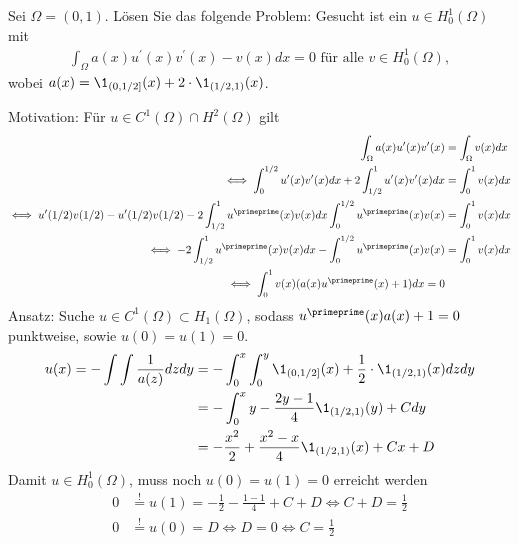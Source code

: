 
\begin{exercise}

Sei $\Omega = (0,1)$. Lösen Sie das folgende Problem: Gesucht ist ein $u \in H_0^1(\Omega)$ mit
\begin{align*}
  \int_\Omega a(x)u^{\prime}(x)v^{\prime}(x) - v(x) dx = 0 \text{ für alle } v \in H_0^1(\Omega),
\end{align*}
wobei $a(x) = \1_{(0,1/2]}(x) + 2\cdot\1_{(1/2,1)}(x)$.
\end{exercise}


\begin{solution}
Motivation: Für $u \in C^1(\Omega) \cap H^2(\Omega)$ gilt
\begin{align*}
  \int_\Omega a(x)u^{\prime}(x)v^{\prime}(x) &= \int_\Omega v(x) dx \\
  \iff \int_0^{1/2} u^{\prime}(x)v^{\prime}(x)dx + 2\int_{1/2}^1 u^{\prime}(x)v^{\prime}(x) dx &= \int_0^1 v(x) dx \\
  \iff u^{\prime}(1/2)v(1/2) - u^{\prime}(1/2)v(1/2) -
  2\int_{1/2}^1 u^{\primeprime}(x)v(x) dx \int_0^{1/2}u^{\primeprime}(x)v(x) &= \int_0^1 v(x) dx \\
  \iff - 2\int_{1/2}^1 u^{\primeprime}(x)v(x) dx - \int_0^{1/2}u^{\primeprime}(x)v(x) &= \int_0^1 v(x) dx \\
  \iff \int_0^1 v(x)(a(x)u^{\primeprime}(x) + 1) dx = 0
\end{align*}
Ansatz: Suche $u \in C^1(\Omega) \subset H_1(\Omega)$, sodass $u^{\primeprime}(x)a(x) + 1 = 0$ punktweise, sowie $u(0) = u(1) = 0$.
\begin{align*}
  u(x) = -\int\int \frac{1}{a(z)} dz dy  &=
  -\int_0^x\int_0^y \1_{(0,1/2]}(x) + \frac{1}{2}\cdot\1_{(1/2,1)}(x) dz dy  \\
  &= -\int_0^x y - \frac{2y-1}{4}\1_{(1/2,1)}(y) + C dy \\
  &= -\frac{x^2}{2} + \frac{x^2-x}{4}\1_{(1/2,1)}(x) + Cx + D
\end{align*}
Damit $u \in H_0^1(\Omega)$, muss noch $u(0) = u(1) = 0$ erreicht werden
\begin{align*}
  0 &\stackrel{!}{=} u(1) = -\frac{1}{2} - \frac{1-1}{4} + C + D \iff C + D = \frac{1}{2} \\
  0 &\stackrel{!}{=} u(0) = D \iff D = 0 \iff C = \frac{1}{2} \\

\end{align*}
\end{solution}
